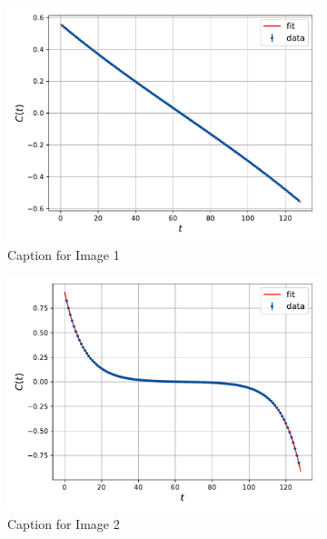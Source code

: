 \begin{figure}
    \centering
    \begin{subfigure}[b]{0.45\textwidth}
        \includegraphics[width=\textwidth]{figures/correlator/corrs_free/corr_small.pdf}
        \caption{Caption for Image 1}
    \end{subfigure}
    \hfill
    \begin{subfigure}[b]{0.45\textwidth}
        \includegraphics[width=\textwidth]{figures/correlator/corrs_free/corr_medium.pdf}
        \caption{Caption for Image 2}
    \end{subfigure}
    \\
    \vspace{20pt}
    \begin{subfigure}[b]{0.45\textwidth}

\end{subfigure}
\end{figure}
